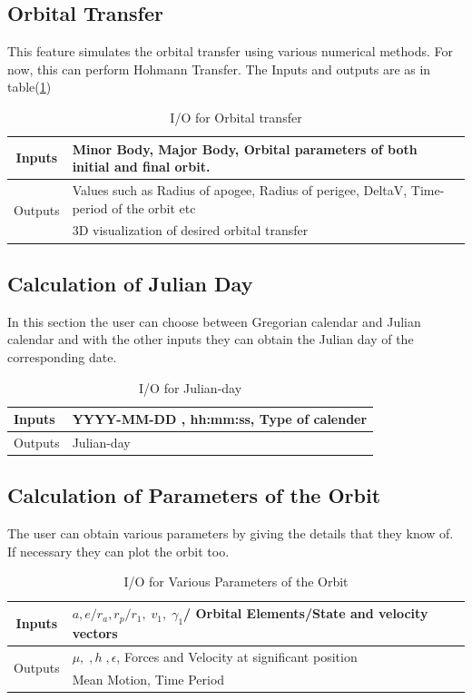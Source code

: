 \documentclass[12pt]{article}
\begin{document}
\subsection{Orbital Transfer}
This feature simulates the orbital transfer using various numerical methods. For now, this can perform Hohmann Transfer. The Inputs and outputs are as in table(\ref{tab:ot})
\begin{table}[H]
\centering
\begin{tabular}{@{}rl@{}}
\toprule
\multicolumn{1}{c}{Inputs} & Minor Body, Major Body, Orbital parameters of both initial and final orbit.                     \\ \midrule
\multirow{2}{*}{Outputs}   & Values such as Radius of apogee, Radius of perigee, DeltaV, Time-period of the orbit etc \\ \cmidrule(l){2-2} 
                           & 3D visualization of desired orbital transfer \\ \bottomrule
\end{tabular}
\caption{I/O for Orbital transfer}
\label{tab:ot}
\end{table}
\subsection{Calculation of Julian Day}
In this section the user can choose between Gregorian calendar and Julian calendar and with the other inputs they can obtain the Julian day of the corresponding date. 
\begin{table}[H]
\centering
\begin{tabular}{@{}ll@{}}
\toprule
Inputs  & YYYY-MM-DD , hh:mm:ss, Type of calender \\ \midrule
Outputs & Julian-day  \\ \bottomrule                                              
\end{tabular}
\caption{I/O for Julian-day}
\label{tab:jd}
\end{table}
\subsection{Calculation of Parameters of the Orbit}
The user can obtain various parameters by giving the details that they know of. If necessary they can plot the orbit too.
\begin{table}[H]
\centering
\begin{tabular}{@{}rl@{}}
\toprule
\multicolumn{1}{c}{Inputs} & $a,e/r_a, r_p/r_1,\;v_1,\;\gamma_1$/ Orbital Elements/State and velocity vectors \\ \midrule
\multirow{2}{*}{Outputs}   & $\mu,\;,h\;,\epsilon$, Forces and Velocity at significant position               \\ \cmidrule(l){2-2} 
                           & Mean Motion, Time Period                                                         \\ \bottomrule
\end{tabular}
\caption{I/O for Various Parameters of the Orbit}
\label{vpco}
\end{table}
\end{document}
